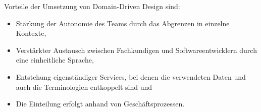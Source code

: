 Vorteile der Umsetzung von Domain-Driven Design sind:
\begin{itemize}
	\item Stärkung der Autonomie des Teams durch das Abgrenzen in einzelne Kontexte,
	\item Verstärkter Austausch zwischen Fachkundigen und Softwareentwicklern durch eine einheitliche Sprache,
	\item Entstehung eigenständiger Services, bei denen die verwendeten Daten und auch die Terminologien entkoppelt sind und
	\item Die Einteilung erfolgt anhand von Geschäftsprozessen.
\end{itemize}
